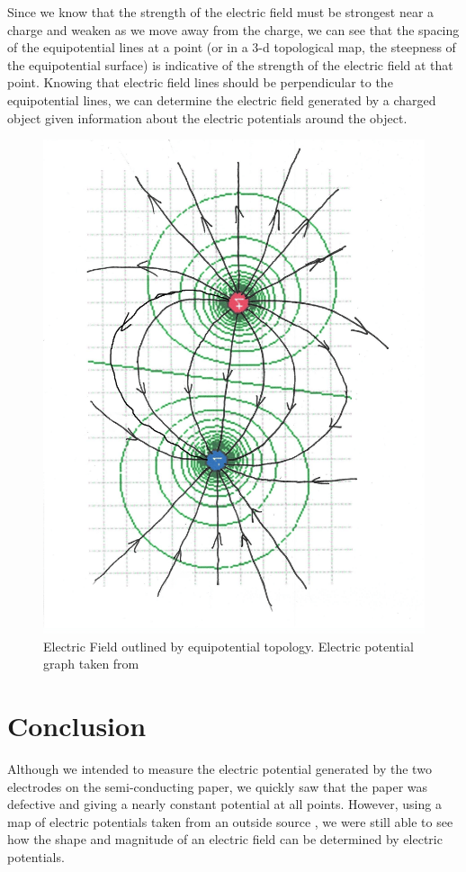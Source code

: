 \documentclass[oneside,12pt]{amsart}
\begin{document}
		\indent Since we know that the strength of the electric field must be strongest near a charge and weaken as we move away from the charge, we can see that the spacing of the equipotential lines at a point (or in a 3-d topological map, the steepness of the equipotential surface) is indicative of the strength of the electric field at that point. Knowing that electric field lines should be perpendicular to the equipotential lines, we can determine the electric field generated by a charged object given information about the electric potentials around the object. 
		\begin{figure}[h]
			\includegraphics[width=\smallgraph,scale=0.01]{field1.png}
			\caption{Electric Field outlined by equipotential topology. Electric potential graph taken from \cite{field}}
			\label{field}
		\end{figure}
	
	\section{Conclusion}
	Although we intended to measure the electric potential generated by the two electrodes on the semi-conducting paper, we quickly saw that the paper was defective and giving a nearly constant potential at all points. However, using a map of electric potentials taken from an outside source \cite{field}, we were still able to see how the shape and magnitude of an electric field can be determined by electric potentials.
		
		\newpage
		\printbibliography
\end{document}
